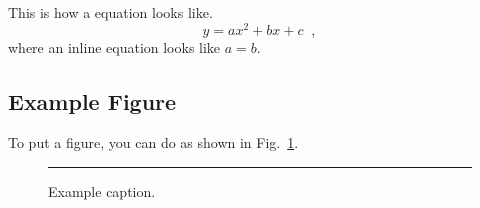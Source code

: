 \documentclass[12pt, letter]{article}
\begin{document}
This is how a equation looks like.
\begin{equation}
  y = a x^2 + b x + c
  \;\;,
\end{equation}
where an inline equation looks like $a=b$.

\subsection{Example  Figure}

To put a figure, you can do as shown in Fig.~\ref{fig:eg}.
\begin{figure}
  \centering
  \rule{2cm}{2cm} %
  \caption{Example caption.}
  \label{fig:eg}
\end{figure}
\end{document}
